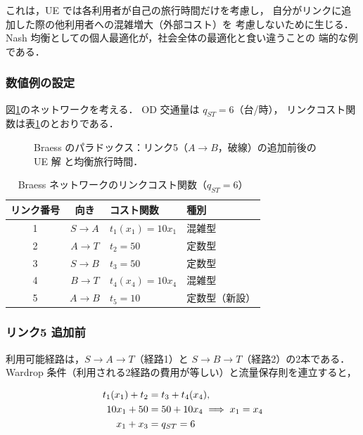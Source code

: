 これは，UE では各利用者が自己の旅行時間だけを考慮し，
自分がリンクに追加した際の他利用者への混雑増大（外部コスト）を
考慮しないために生じる．
Nash 均衡としての個人最適化が，社会全体の最適化と食い違うことの
端的な例である．

\subsubsection*{数値例の設定}

図\ref{fig:braess-network}のネットワークを考える．
OD 交通量は $q_{ST} = 6$（台/時），
リンクコスト関数は表\ref{tab:braess-links}のとおりである．

\begin{figure}[hbtp]
  \centering
  
  \caption{Braess のパラドックス：リンク5（$A \to B$，破線）の追加前後の UE 解
           と均衡旅行時間．}
  \label{fig:braess-network}
\end{figure}

\begin{table}[hbtp]
  \centering
  \caption{Braess ネットワークのリンクコスト関数（$q_{ST}=6$）}
  \label{tab:braess-links}
  \begin{tabular}{ccll}
    \toprule
    リンク番号 & 向き & コスト関数 & 種別 \\
    \midrule
    1 & $S \to A$ & $t_1(x_1) = 10 x_1$ & 混雑型 \\
    2 & $A \to T$ & $t_2 = 50$ & 定数型 \\
    3 & $S \to B$ & $t_3 = 50$ & 定数型 \\
    4 & $B \to T$ & $t_4(x_4) = 10 x_4$ & 混雑型 \\
    5 & $A \to B$ & $t_5 = 10$ & 定数型（新設） \\
    \bottomrule
  \end{tabular}
\end{table}

\subsubsection*{リンク5 追加前}

利用可能経路は，$S \to A \to T$（経路1）と $S \to B \to T$（経路2）の2本である．
Wardrop 条件（利用される2経路の費用が等しい）と流量保存則を連立すると，

\begin{align}
  t_1(x_1) + t_2 &= t_3 + t_4(x_4), \notag\\
  10 x_1 + 50 &= 50 + 10 x_4
  \implies x_1 = x_4
  \label{eq:braess-before-ue}\\
  x_1 + x_3 &= q_{ST} = 6
  \label{eq:braess-before-conserv}
\end{align}

